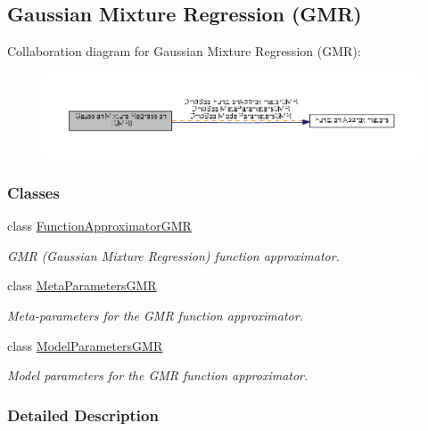 \hypertarget{group__GMR}{\subsection{Gaussian Mixture Regression (G\+M\+R)}
\label{group__GMR}
}
Collaboration diagram for Gaussian Mixture Regression (G\+M\+R)\+:
\nopagebreak
\begin{figure}[H]
\begin{center}
\leavevmode
\includegraphics[width=350pt]{group__GMR}
\end{center}
\end{figure}
\subsubsection*{Classes}
\begin{DoxyCompactItemize}
\item 
class \hyperlink{classDmpBbo_1_1FunctionApproximatorGMR}{Function\+Approximator\+G\+M\+R}
\begin{DoxyCompactList}\small\item\em G\+M\+R (Gaussian Mixture Regression) function approximator. \end{DoxyCompactList}\item 
class \hyperlink{classDmpBbo_1_1MetaParametersGMR}{Meta\+Parameters\+G\+M\+R}
\begin{DoxyCompactList}\small\item\em Meta-\/parameters for the G\+M\+R function approximator. \end{DoxyCompactList}\item 
class \hyperlink{classDmpBbo_1_1ModelParametersGMR}{Model\+Parameters\+G\+M\+R}
\begin{DoxyCompactList}\small\item\em Model parameters for the G\+M\+R function approximator. \end{DoxyCompactList}\end{DoxyCompactItemize}


\subsubsection{Detailed Description}
